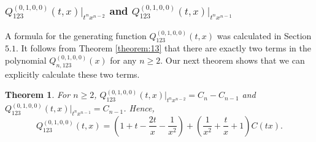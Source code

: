 \documentclass[
final,nomarks
]{dmtcs-episciences}
\newtheorem{theorem}{Theorem}
\newcommand{\tref}[1]{Theorem \ref{theorem:#1}}
\newcommand{\Qm}[1]{Q_{123}^{(#1)}(t,x)}
\newcommand{\Qmn}[2]{Q_{#2,123}^{(#1)}(x)}
\begin{document}
\subsubsection{\(\Qm{0,1,0,0}\big|_{t^n x^{n-2}}\) and \(\Qm{0,1,0,0}\big|_{t^n x^{n-1}}\)}
A formula for the generating function 
\begin{math}\Qm{0,1,0,0}\end{math} was calculated in Section \begin{math}5.1\end{math}. It follows from \tref{13} that there 
are exactly two terms in the polynomial \begin{math}\Qmn{0,1,0,0}{n}\end{math} for any \begin{math}n \geq 2\end{math}. 
Our next theorem shows that we can explicitly calculate these two terms.

\begin{theorem}\label{theorem:14}
	For \begin{math}n\geq 2\end{math}, \begin{math}\Qm{0,1,0,0}\big|_{t^n x^{n-2}}=C_n-C_{n-1}\end{math} and \begin{math}\Qm{0,1,0,0}\big|_{t^n x^{n-1}}=C_{n-1}\end{math}. Hence, 
	\begin{equation}
	\Qm{0,1,0,0}=(1+t-\frac{2t}{x}-\frac{1}{x^2})+(\frac{1}{x^2}+\frac{t}{x}+1)C(tx).
	\end{equation}
\end{theorem}
\end{document}
